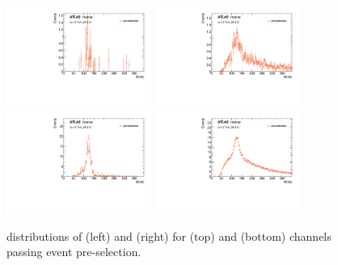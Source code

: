 \begin{figure}[htbp]
  \centering
 \includegraphics[width=0.42\textwidth]{figures/VBF/Mbb_VH_2cen.pdf}
 \includegraphics[width=0.42\textwidth]{figures/VBF/Mbb_ttH_2cen.pdf}\\
 \includegraphics[width=0.42\textwidth]{figures/VBF/Mbb_VH_4cen.pdf}
 \includegraphics[width=0.42\textwidth]{figures/VBF/Mbb_ttH_4cen.pdf}
 \caption{\Mbb distributions of \VH (left) and \ttH (right) for \twocentral (top) and \fourcentral (bottom) channels passing event pre-selection. }
  \label{fig:Mbb-ttH-VH}
\end{figure}

